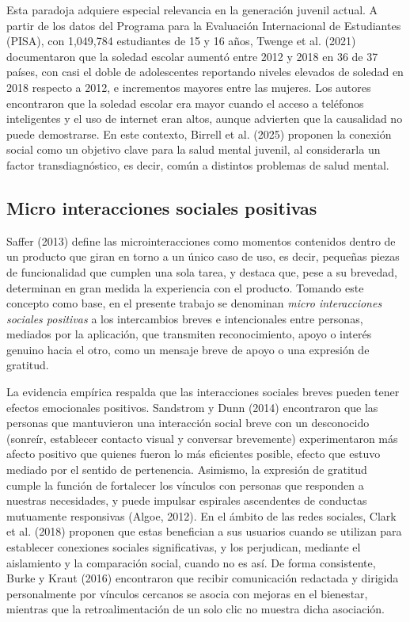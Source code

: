 Esta paradoja adquiere especial relevancia en la generación juvenil actual. A partir de los datos del Programa para la Evaluación Internacional de Estudiantes (PISA), con 1,049,784 estudiantes de 15 y 16 años, Twenge et al. (2021) documentaron que la soledad escolar aumentó entre 2012 y 2018 en 36 de 37 países, con casi el doble de adolescentes reportando niveles elevados de soledad en 2018 respecto a 2012, e incrementos mayores entre las mujeres. Los autores encontraron que la soledad escolar era mayor cuando el acceso a teléfonos inteligentes y el uso de internet eran altos, aunque advierten que la causalidad no puede demostrarse. En este contexto, Birrell et al. (2025) proponen la conexión social como un objetivo clave para la salud mental juvenil, al considerarla un factor transdiagnóstico, es decir, común a distintos problemas de salud mental.

\subsection{Micro interacciones sociales positivas}
Saffer (2013) define las microinteracciones como momentos contenidos dentro de un producto que giran en torno a un único caso de uso, es decir, pequeñas piezas de funcionalidad que cumplen una sola tarea, y destaca que, pese a su brevedad, determinan en gran medida la experiencia con el producto. Tomando este concepto como base, en el presente trabajo se denominan \textit{micro interacciones sociales positivas} a los intercambios breves e intencionales entre personas, mediados por la aplicación, que transmiten reconocimiento, apoyo o interés genuino hacia el otro, como un mensaje breve de apoyo o una expresión de gratitud.

La evidencia empírica respalda que las interacciones sociales breves pueden tener efectos emocionales positivos. Sandstrom y Dunn (2014) encontraron que las personas que mantuvieron una interacción social breve con un desconocido (sonreír, establecer contacto visual y conversar brevemente) experimentaron más afecto positivo que quienes fueron lo más eficientes posible, efecto que estuvo mediado por el sentido de pertenencia. Asimismo, la expresión de gratitud cumple la función de fortalecer los vínculos con personas que responden a nuestras necesidades, y puede impulsar espirales ascendentes de conductas mutuamente responsivas (Algoe, 2012). En el ámbito de las redes sociales, Clark et al. (2018) proponen que estas benefician a sus usuarios cuando se utilizan para establecer conexiones sociales significativas, y los perjudican, mediante el aislamiento y la comparación social, cuando no es así. De forma consistente, Burke y Kraut (2016) encontraron que recibir comunicación redactada y dirigida personalmente por vínculos cercanos se asocia con mejoras en el bienestar, mientras que la retroalimentación de un solo clic no muestra dicha asociación.
